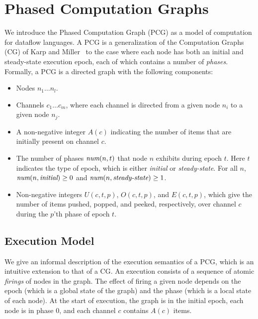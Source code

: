 \section{Phased Computation Graphs}
\label{sec:pcg}

We introduce the Phased Computation Graph (PCG) as a model of
computation for dataflow languages.  A PCG is a generalization of the
Computation Graphs (CG) of Karp and Miller~\cite{KM66} to the case
where each node has both an initial and steady-state execution epoch,
each of which contains a number of {\it phases}.  Formally, a PCG is a
directed graph with the following components:
\begin{itemize}

\item Nodes $n_1 \dots n_l$.

\item Channels $c_1 \dots c_m$, where each channel is directed from a
  given node $n_i$ to a given node $n_j$.

\item A non-negative integer $A(c)$ indicating the number of items
  that are initially present on channel $c$.

\item The number of phases $\mbox{\it num}(n, t)$ that node $n$ exhibits
during epoch $t$.  Here $t$ indicates the type of epoch, which is
either \textit{initial} or \textit{steady-state}.  For all $n$,
$\mbox{\it num}(n, \mbox{\it initial}) \ge 0$ and $\mbox{\it num}(n, \mbox{\it steady-state})
\ge 1$.

\item Non-negative integers $U(c, t, p)$, $O(c, t, p)$, and $E(c, t,
p)$, which give the number of items pushed, popped, and peeked,
respectively, over channel $c$ during the $p$'th phase of epoch $t$.

\end{itemize}

\subsection{Execution Model}

We give an informal description of the execution semantics of a PCG,
which is an intuitive extension to that of a CG.  An execution
consists of a sequence of atomic {\it firings} of nodes in the graph.
The effect of firing a given node depends on the epoch (which is a
global state of the graph) and the phase (which is a local state of
each node). At the start of execution, the graph is in the initial
epoch, each node is in phase 0, and each channel $c$ contains $A(c)$
items.

